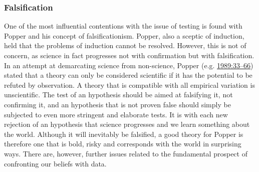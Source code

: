 \documentclass[
  a4paper,
  oneside]{uiophdthesis}
\begin{document}
\hypertarget{falsification}{%
\subsubsection{Falsification}\label{falsification}}

One of the most influential contentions with the issue of testing is found with Popper and his concept of falsificationism. Popper, also a sceptic of induction, held that the problems of induction cannot be resolved. However, this is not of concern, as science in fact progresses not with confirmation but with falsification. In an attempt at demarcating science from non-science, Popper (e.g. \protect\hyperlink{ref-popper1989}{1989:33--66}) stated that a theory can only be considered scientific if it has the potential to be refuted by observation. A theory that is compatible with all empirical variation is unscientific. The test of an hypothesis should be aimed at falsifying it, not confirming it, and an hypothesis that is not proven false should simply be subjected to even more stringent and elaborate tests. It is with each new rejection of an hypothesis that science progresses and we learn something about the world. Although it will inevitably be falsified, a good theory for Popper is therefore one that is bold, risky and corresponds with the world in surprising ways. There are, however, further issues related to the fundamental prospect of confronting our beliefs with data.
\end{document}
